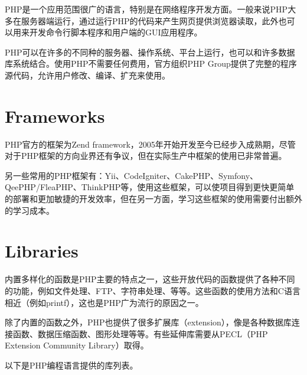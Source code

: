 PHP是一个应用范围很广的语言，特别是在网络程序开发方面。一般来说PHP大多在服务器端运行，通过运行PHP的代码来产生网页提供浏览器读取，此外也可以用来开发命令行脚本程序和用户端的GUI应用程序。

PHP可以在许多的不同种的服务器、操作系统、平台上运行，也可以和许多数据库系统结合。使用PHP不需要任何费用，官方组织PHP Group提供了完整的程序源代码，允许用户修改、编译、扩充来使用。




\section{Frameworks}

PHP官方的框架为Zend framework，2005年开始开发至今已经步入成熟期，尽管对于PHP框架的方向业界还有争议，但在实际生产中框架的使用已非常普遍。

另一些常用的PHP框架有：Yii、CodeIgniter、CakePHP、Symfony、QeePHP/FleaPHP、ThinkPHP等，使用这些框架，可以使项目得到更快更简单的部署和更加敏捷的开发效率，但在另一方面，学习这些框架的使用需要付出额外的学习成本。





\section{Libraries}



内置多样化的函数是PHP主要的特点之一，这些开放代码的函数提供了各种不同的功能，例如文件处理、FTP、字符串处理、等等。这些函数的使用方法和C语言相近（例如printf），这也是PHP广为流行的原因之一。

除了内置的函数之外，PHP也提供了很多扩展库（extension），像是各种数据库连接函数、数据压缩函数、图形处理等等。有些延伸库需要从PECL（PHP Extension Community Library）取得。

以下是PHP编程语言提供的库列表。



